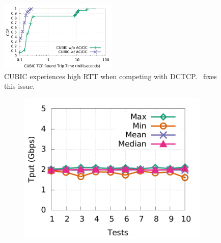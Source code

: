 \begin{figure}[!t]
        \centering
  \includegraphics[width=0.5\textwidth]{acdctcp/figures/micro2flows/coexitence/sockperf_and_droprate/coexistence_sockperf.pdf}
        \caption{CUBIC experiences high RTT when competing with DCTCP.~\acdc{} fixes this issue.}
        \label{coexistence_sockperf_droprate}
\end{figure}

\begin{figure}[!t]
        \centering
        \begin{subfigure}[b]{0.45\textwidth}
                \centering
                \includegraphics[width=\textwidth]{acdctcp/figures/tput_fairness/ecn_all_dctcp_tput.pdf}

\end{subfigure}
\end{figure}
